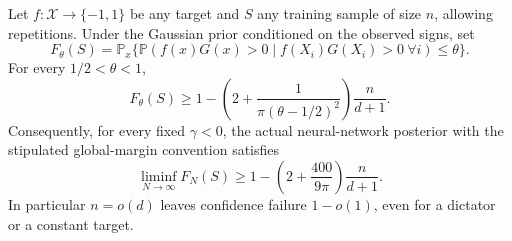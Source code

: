 \begin{theorem}\label{thm:negative-linear}
Let $f:\mathcal X\to\{-1,1\}$ be any target and $S$ any training
sample of size $n$, allowing repetitions. Under the Gaussian prior
conditioned on the observed signs, set
\[
 F_\theta(S)=\mathbb P_x\{
       \mathbb P(f(x)G(x)>0\mid f(X_i)G(X_i)>0\ \forall i)
                  \le\theta\}.
\]
For every $1/2<\theta<1$,
\begin{equation}\label{eq:negative-linear}
 F_\theta(S)\ge
 1-\left(2+\frac1{\pi(\theta-1/2)^2}\right)\frac{n}{d+1}.
\end{equation}
Consequently, for every fixed $\gamma<0$, the actual neural-network
posterior with the stipulated global-margin convention satisfies
\begin{equation}\label{eq:negative-linear-width}
 \liminf_{N\to\infty}F_N(S)
 \ge1-\left(2+\frac{400}{9\pi}\right)\frac{n}{d+1}.
\end{equation}
In particular $n=o(d)$ leaves confidence failure $1-o(1)$, even
for a dictator or a constant target.
\end{theorem}
